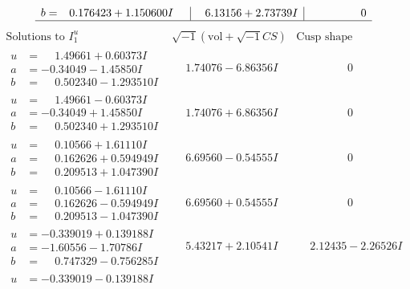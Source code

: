 \documentclass[1p]{elsarticle_modified}
\theoremstyle{definition}
\newcommand{\I}{\sqrt{-1}}
\begin{document}
$$\begin{array}{c|c|c}
\begin{aligned}
b &= \phantom{-}0.176423 + 1.150600 I\end{aligned}
 & \phantom{-}6.13156 + 2.73739 I & \phantom{-0.000000 } 0\\
 \hline 
 \end{array}$$\newpage$$\begin{array}{c|c|c}  
\text{Solutions to }I^u_{1}& \I (\text{vol} + \sqrt{-1}CS) & \text{Cusp shape}\\
 \hline 
\begin{aligned}
u &= \phantom{-}1.49661 + 0.60373 I \\
a &= -0.34049 - 1.45850 I \\
b &= \phantom{-}0.502340 - 1.293510 I\end{aligned}
 & \phantom{-}1.74076 - 6.86356 I & \phantom{-0.000000 } 0 \\ \hline\begin{aligned}
u &= \phantom{-}1.49661 - 0.60373 I \\
a &= -0.34049 + 1.45850 I \\
b &= \phantom{-}0.502340 + 1.293510 I\end{aligned}
 & \phantom{-}1.74076 + 6.86356 I & \phantom{-0.000000 } 0 \\ \hline\begin{aligned}
u &= \phantom{-}0.10566 + 1.61110 I \\
a &= \phantom{-}0.162626 + 0.594949 I \\
b &= \phantom{-}0.209513 + 1.047390 I\end{aligned}
 & \phantom{-}6.69560 - 0.54555 I & \phantom{-0.000000 } 0 \\ \hline\begin{aligned}
u &= \phantom{-}0.10566 - 1.61110 I \\
a &= \phantom{-}0.162626 - 0.594949 I \\
b &= \phantom{-}0.209513 - 1.047390 I\end{aligned}
 & \phantom{-}6.69560 + 0.54555 I & \phantom{-0.000000 } 0 \\ \hline\begin{aligned}
u &= -0.339019 + 0.139188 I \\
a &= -1.60556 - 1.70786 I \\
b &= \phantom{-}0.747329 - 0.756285 I\end{aligned}
 & \phantom{-}5.43217 + 2.10541 I & \phantom{-}2.12435 - 2.26526 I \\ \hline\begin{aligned}
u &= -0.339019 - 0.139188 I \\

\end{aligned}
\end{array}$$
\end{document}

